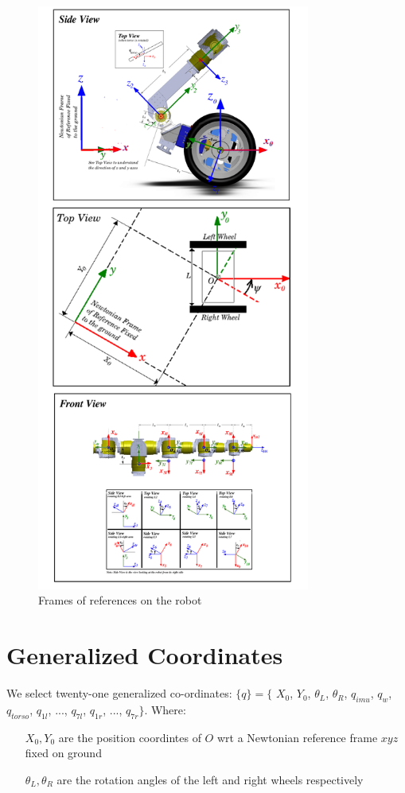 \documentclass[a4paper,10pt]{article}
\begin{document}
\begin{figure}
 \centering
 \includegraphics[width=0.8\textwidth]{Figures/frames.png}
 \caption{Frames of references on the robot}
 \label{fig:frames}
\end{figure}

\section{Generalized Coordinates}

We select twenty-one generalized co-ordinates: $\{q\} = \{$ $X_0$, $Y_0$, $\theta_L$, $\theta_R$, $q_{imu}$, $q_{w}$, $q_{torso}$, $q_{1l}$, $...$, $q_{7l}$, $q_{1r}$, $...$, $q_{7r} \}$. Where:
\begin{itemize}[label={}]
 \item[$X_0, Y_0$] are the position coordintes of $O$ wrt a Newtonian reference frame $xyz$ fixed on ground
 \item[$\theta_L, \theta_R$] are the rotation angles of the left and right wheels respectively
\end{itemize}
\end{document}
